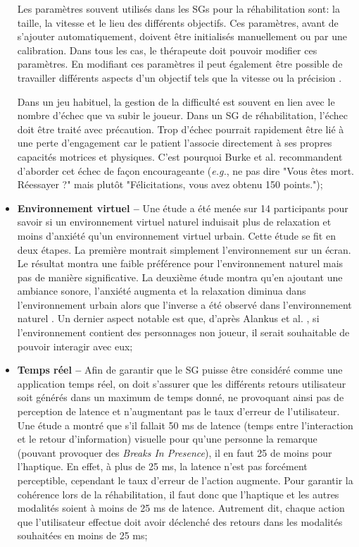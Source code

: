 \begin{itemize}
		Les paramètres souvent utilisés dans les SGs pour la réhabilitation sont: la taille, la vitesse et le lieu des différents objectifs. Ces paramètres, avant de s'ajouter automatiquement, doivent être initialisés manuellement ou par une calibration. Dans tous les cas, le thérapeute doit pouvoir modifier ces paramètres. En modifiant ces paramètres il peut également être possible de travailler différents aspects d'un objectif tels que la vitesse ou la précision \cite{Alankus_TowardsCustomizableGames}.
		
		Dans un jeu habituel, la gestion de la difficulté est souvent en lien avec le nombre d'échec que va subir le joueur. Dans un SG de réhabilitation, l'échec doit être traité avec précaution. Trop d'échec pourrait rapidement être lié à une perte d'engagement car le patient l'associe directement à ses propres capacités motrices et physiques. C'est pourquoi Burke et al. \cite{Burke_DesigningEngagingPlayableGames4Rehab} recommandent d'aborder cet échec de façon encourageante (\textit{e.g.}, ne pas dire "Vous êtes mort. Réessayer ?" mais plutôt "Félicitations, vous avez obtenu 150 points.");
		
		\item \textbf{Environnement virtuel --} Une étude a été menée sur 14 participants pour savoir si un environnement virtuel naturel induisait plus de relaxation et moins d'anxiété qu'un environnement virtuel urbain. Cette étude se fit en deux étapes. La première montrait simplement l'environnement sur un écran. Le résultat montra une faible préférence pour l'environnement naturel mais pas de manière significative. La deuxième étude montra qu'en ajoutant une ambiance sonore, l'anxiété augmenta et la relaxation diminua dans l'environnement urbain alors que l'inverse a été observé dans l'environnement naturel \cite{VARSG4HC1}.
		Un dernier aspect notable est que, d'après Alankus et al. \cite{Alankus_TowardsCustomizableGames}, si l'environnement contient des personnages non joueur, il serait souhaitable de pouvoir interagir avec eux;	
		
		\item \textbf{Temps réel --} Afin de garantir que le SG puisse être considéré comme une application temps réel, on doit s'assurer que les différents retours utilisateur soit générés dans un maximum de temps donné, ne provoquant ainsi pas de perception de latence et n'augmentant pas le taux d'erreur de l'utilisateur. Une étude \cite{Jay_RT_ModelingEffectsDelayedHaptic} a montré que s'il fallait 50 ms de latence (temps entre l'interaction et le retour d'information) visuelle pour qu'une personne la remarque (pouvant provoquer des \textit{Breaks In Presence}), il en faut 25 de moins pour l'haptique. En effet, à plus de 25 ms, la latence n'est pas forcément perceptible, cependant le taux d'erreur de l'action augmente. Pour garantir la cohérence lors de la réhabilitation, il faut donc que l'haptique et les autres modalités soient à moins de 25 ms de latence. Autrement dit, chaque action que l'utilisateur effectue doit avoir déclenché des retours dans les modalités souhaitées en moins de 25 ms;
		

\end{itemize}
